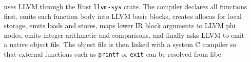 \epl{} uses LLVM through the Rust \texttt{llvm-sys} crate. The compiler declares
all functions first, emits each function body into LLVM basic blocks, creates
allocas for local storage, emits loads and stores, maps lower IR block arguments
to LLVM phi nodes, emits integer arithmetic and comparisons, and finally asks
LLVM to emit a native object file. The object file is then linked with a system
C compiler so that external functions such as \texttt{printf} or \texttt{exit}
can be resolved from libc.
